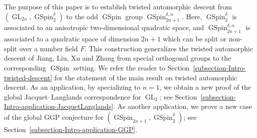 \documentclass[12pt]{amsart}
\theoremstyle{remark}
\DeclareMathOperator{\GL}{GL}
\DeclareMathOperator{\GSpin}{GSpin}
\begin{document}
The purpose of this paper is to establish twisted automorphic descent from $(\GL_{2n}, \GSpin_2^\delta)$ to the odd $\GSpin$ group $\GSpin_{2n+1}^{\delta, \alpha}$. Here, $\GSpin_2^\delta$ is associated to an anisotropic two-dimensional quadratic space, and $\GSpin_{2n+1}^{\delta, \alpha}$ is associated to a quadratic space of dimension $2n+1$ which can be split or non-split over a number field $F$. This construction generalizes the twisted automorphic descent of Jiang, Liu, Xu and Zhang \cite{JiangLiuXuZhang2016} from special orthogonal groups to the corresponding $\GSpin$ setting.  We refer the reader to Section~\ref{subsection-Intro-twisted-descent} for the statement of the main result on twisted automorphic descent. As an application, by specializing to $n=1$, we obtain a new proof of the global Jacquet--Langlands correspondence for $\GL_2$; see Section~\ref{subsection-Intro-application-JacquetLanglands}. As another application, we prove a new case of the global GGP conjecture for $(\GSpin_{2n+1}, \GSpin_2^\delta)$; see Section~\ref{subsection-Intro-application-GGP}.  
\end{document}
